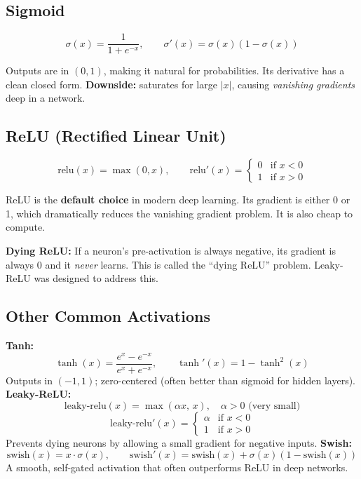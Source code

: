 \documentclass[12pt]{article}
\begin{document}
\subsection{Sigmoid}

\[
\sigma(x) = \frac{1}{1 + e^{-x}}, \qquad \sigma'(x) = \sigma(x)(1 - \sigma(x))
\]

Outputs are in $(0,1)$, making it natural for probabilities. Its derivative has a clean closed form. \textbf{Downside:} saturates for large $|x|$, causing \emph{vanishing gradients} deep in a network.

\subsection{ReLU (Rectified Linear Unit)}

\[
\text{relu}(x) = \max(0, x), \qquad \text{relu}'(x) = \begin{cases} 0 & \text{if } x < 0 \\ 1 & \text{if } x > 0 \end{cases}
\]

ReLU is the \textbf{default choice} in modern deep learning. Its gradient is either 0 or 1, which dramatically reduces the vanishing gradient problem. It is also cheap to compute.

\begin{notebox}
\textbf{Dying ReLU:} If a neuron's pre-activation is always negative, its gradient is
always 0 and it \emph{never} learns. This is called the ``dying ReLU'' problem.
Leaky-ReLU was designed to address this.
\end{notebox}

\subsection{Other Common Activations}

\textbf{Tanh:}
\[
\tanh(x) = \frac{e^x - e^{-x}}{e^x + e^{-x}}, \qquad \tanh'(x) = 1 - \tanh^2(x)
\]
Outputs in $(-1, 1)$; zero-centered (often better than sigmoid for hidden layers).
\newline
\textbf{Leaky-ReLU:}
\[
\text{leaky-relu}(x) = \max(\alpha x,\, x), \quad \alpha > 0 \text{ (very small)}
\]
\[
\text{leaky-relu}'(x) = \begin{cases} \alpha & \text{if } x < 0 \\ 1 & \text{if } x > 0 \end{cases}
\]
Prevents dying neurons by allowing a small gradient for negative inputs.
\newline
\textbf{Swish:}
\[
\text{swish}(x) = x \cdot \sigma(x), \qquad \text{swish}'(x) = \text{swish}(x) + \sigma(x)(1 - \text{swish}(x))
\]
A smooth, self-gated activation that often outperforms ReLU in deep networks.
\end{document}
